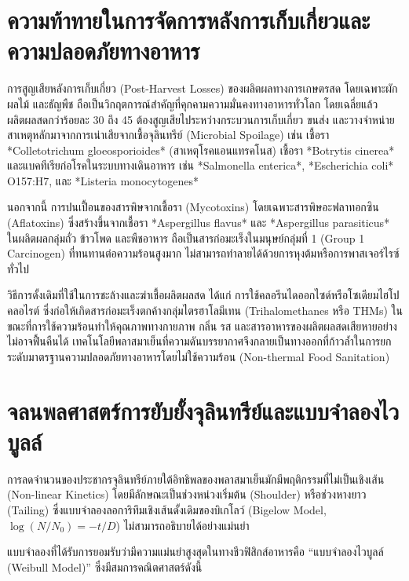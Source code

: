 \clearpage


\section{ความท้าทายในการจัดการหลังการเก็บเกี่ยวและความปลอดภัยทางอาหาร}

การสูญเสียหลังการเก็บเกี่ยว (Post-Harvest Losses) ของผลิตผลทางการเกษตรสด โดยเฉพาะผัก ผลไม้ และธัญพืช ถือเป็นวิกฤตการณ์สำคัญที่คุกคามความมั่นคงทางอาหารทั่วโลก โดยเฉลี่ยแล้ว ผลิตผลสดกว่าร้อยละ 30 ถึง 45 ต้องสูญเสียไประหว่างกระบวนการเก็บเกี่ยว ขนส่ง และวางจำหน่าย สาเหตุหลักมาจากการเน่าเสียจากเชื้อจุลินทรีย์ (Microbial Spoilage) เช่น เชื้อรา *Colletotrichum gloeosporioides* (สาเหตุโรคแอนแทรคโนส) เชื้อรา *Botrytis cinerea* และแบคทีเรียก่อโรคในระบบทางเดินอาหาร เช่น *Salmonella enterica*, *Escherichia coli* O157:H7, และ *Listeria monocytogenes*

นอกจากนี้ การปนเปื้อนของสารพิษจากเชื้อรา (Mycotoxins) โดยเฉพาะสารพิษอะฟลาทอกซิน (Aflatoxins) ซึ่งสร้างขึ้นจากเชื้อรา *Aspergillus flavus* และ *Aspergillus parasiticus* ในผลิตผลกลุ่มถั่ว ข้าวโพด และพืชอาหาร ถือเป็นสารก่อมะเร็งในมนุษย์กลุ่มที่ 1 (Group 1 Carcinogen) ที่ทนทานต่อความร้อนสูงมาก ไม่สามารถทำลายได้ด้วยการหุงต้มหรือการพาสเจอร์ไรซ์ทั่วไป

วิธีการดั้งเดิมที่ใช้ในการชะล้างและฆ่าเชื้อผลิตผลสด ได้แก่ การใช้คลอรีนไดออกไซด์หรือโซเดียมไฮโปคลอไรต์ ซึ่งก่อให้เกิดสารก่อมะเร็งตกค้างกลุ่มไตรฮาโลมีเทน (Trihalomethanes หรือ THMs) ในขณะที่การใช้ความร้อนทำให้คุณภาพทางกายภาพ กลิ่น รส และสารอาหารของผลิตผลสดเสียหายอย่างไม่อาจฟื้นคืนได้ เทคโนโลยีพลาสมาเย็นที่ความดันบรรยากาศจึงกลายเป็นทางออกที่ก้าวล้ำในการยกระดับมาตรฐานความปลอดภัยทางอาหารโดยไม่ใช้ความร้อน (Non-thermal Food Sanitation)

\section{จลนพลศาสตร์การยับยั้งจุลินทรีย์และแบบจำลองไวบูลล์}

การลดจำนวนของประชากรจุลินทรีย์ภายใต้อิทธิพลของพลาสมาเย็นมักมีพฤติกรรมที่ไม่เป็นเชิงเส้น (Non-linear Kinetics) โดยมีลักษณะเป็นช่วงหน่วงเริ่มต้น (Shoulder) หรือช่วงหางยาว (Tailing) ซึ่งแบบจำลองลอการิทึมเชิงเส้นดั้งเดิมของบิเกโลว์ (Bigelow Model, $\log(N/N_0) = -t/D$) ไม่สามารถอธิบายได้อย่างแม่นยำ

แบบจำลองที่ได้รับการยอมรับว่ามีความแม่นยำสูงสุดในทางชีวฟิสิกส์อาหารคือ ``แบบจำลองไวบูลล์ (Weibull Model)'' ซึ่งมีสมการคณิตศาสตร์ดังนี้

